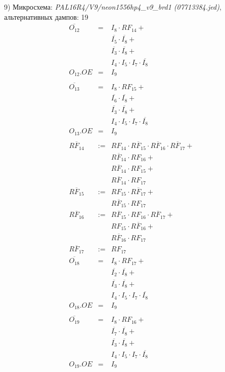 \documentclass[a4paper,russian]{report}
\begin{document}
9) Микросхема: \emph{PAL16R4/V9/neon1556hp4\_v9\_brd1  (07713384.jed)}, альтернативных дампов: 19
\nopagebreak\begin{eqnarray*}
    \overline{O_{12}} & = & I_{8} \cdotp RF_{14} + \\
	& &  \overline{I_{5}} \cdotp \overline{I_{8}} + \\
	& &  \overline{I_{3}} \cdotp \overline{I_{8}} + \\
	& &  I_{4} \cdotp I_{5} \cdotp I_{7} \cdotp \overline{I_{8}} \\
    O_{12}.OE & = & I_{9} \\ \\
    \overline{O_{13}} & = & I_{8} \cdotp RF_{15} + \\
	& &  \overline{I_{6}} \cdotp \overline{I_{8}} + \\
	& &  \overline{I_{3}} \cdotp \overline{I_{8}} + \\
	& &  I_{4} \cdotp I_{5} \cdotp I_{7} \cdotp \overline{I_{8}} \\
    O_{13}.OE & = & I_{9} \\ \\
    \overline{RF_{14}} & := & RF_{14} \cdotp \overline{RF_{15}} \cdotp \overline{RF_{16}} \cdotp \overline{RF_{17}} + \\
	& &  \overline{RF_{14}} \cdotp RF_{16} + \\
	& &  \overline{RF_{14}} \cdotp RF_{15} + \\
	& &  \overline{RF_{14}} \cdotp RF_{17} \\
    \overline{RF_{15}} & := & RF_{15} \cdotp \overline{RF_{17}} + \\
	& &  \overline{RF_{15}} \cdotp RF_{17} \\
    \overline{RF_{16}} & := & \overline{RF_{15}} \cdotp RF_{16} \cdotp \overline{RF_{17}} + \\
	& &  RF_{15} \cdotp \overline{RF_{16}} + \\
	& &  \overline{RF_{16}} \cdotp RF_{17} \\
    \overline{RF_{17}} & := & RF_{17} \\
    \overline{O_{18}} & = & I_{8} \cdotp RF_{17} + \\
	& &  \overline{I_{2}} \cdotp \overline{I_{8}} + \\
	& &  \overline{I_{3}} \cdotp \overline{I_{8}} + \\
	& &  I_{4} \cdotp I_{5} \cdotp I_{7} \cdotp \overline{I_{8}} \\
    O_{18}.OE & = & I_{9} \\ \\
    \overline{O_{19}} & = & I_{8} \cdotp RF_{16} + \\
	& &  \overline{I_{7}} \cdotp \overline{I_{8}} + \\
	& &  \overline{I_{3}} \cdotp \overline{I_{8}} + \\
	& &  I_{4} \cdotp I_{5} \cdotp I_{7} \cdotp \overline{I_{8}} \\
    O_{19}.OE & = & I_{9} \\ \\
 \end{eqnarray*}
\pagebreak[1]
\end{document}
